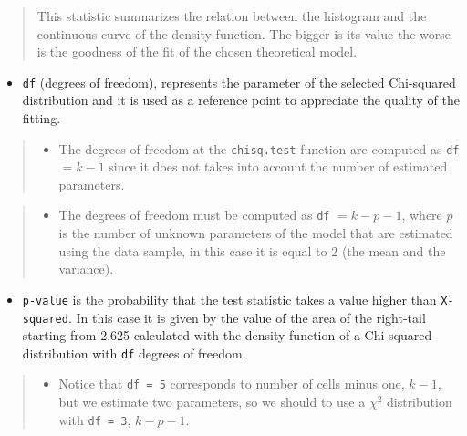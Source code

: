 \documentclass[
]{article}
\providecommand{\tightlist}{%
  \setlength{\itemsep}{0pt}\setlength{\parskip}{0pt}}
\begin{document}
\begin{quote}
This statistic summarizes the relation between the histogram and the
continuous curve of the density function. The bigger is its value the
worse is the goodness of the fit of the chosen theoretical model.
\end{quote}

\begin{itemize}
\tightlist
\item
  \texttt{df} (degrees of freedom), represents the parameter of the
  selected Chi-squared distribution and it is used as a reference point
  to appreciate the quality of the fitting.
\end{itemize}

\begin{quote}
\begin{itemize}
\tightlist
\item
  The degrees of freedom at the \texttt{chisq.test} function are
  computed as \texttt{df} \(= k - 1\) since it does not takes into
  account the number of estimated parameters.
\end{itemize}
\end{quote}

\begin{quote}
\begin{itemize}
\tightlist
\item
  The degrees of freedom must be computed as \texttt{df}
  \(= k - p - 1\), where \(p\) is the number of unknown parameters of
  the model that are estimated using the data sample, in this case it is
  equal to 2 (the mean and the variance).
\end{itemize}
\end{quote}

\begin{itemize}
\tightlist
\item
  \texttt{p-value} is the probability that the test statistic takes a
  value higher than \texttt{X-squared}. In this case it is given by the
  value of the area of the right-tail starting from 2.625 calculated
  with the density function of a Chi-squared distribution with
  \texttt{df} degrees of freedom.
\end{itemize}

\begin{quote}
\begin{itemize}
\tightlist
\item
  Notice that \texttt{df\ =\ 5} corresponds to number of cells minus
  one, \(k-1\), but we estimate two parameters, so we should to use a
  \(\chi^2\) distribution with \texttt{df\ =\ 3}, \(k - p - 1\).
\end{itemize}
\end{quote}
\end{document}
